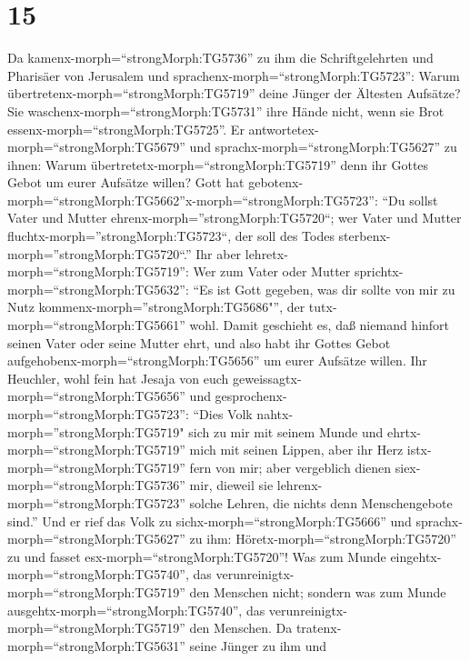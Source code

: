 \hypertarget{section-14}{%
\section{15}\label{section-14}}

 Da kamenx-morph=``strongMorph:TG5736'' zu ihm die
Schriftgelehrten und Pharisäer von Jerusalem und
sprachenx-morph=``strongMorph:TG5723'':  Warum
übertretenx-morph=``strongMorph:TG5719'' deine Jünger der Ältesten
Aufsätze? Sie waschenx-morph=``strongMorph:TG5731'' ihre Hände nicht,
wenn sie Brot essenx-morph=``strongMorph:TG5725''.  Er
antwortetex-morph=``strongMorph:TG5679'' und
sprachx-morph=``strongMorph:TG5627'' zu ihnen: Warum
übertretetx-morph=``strongMorph:TG5719'' denn ihr Gottes Gebot um eurer
Aufsätze willen?  Gott hat
gebotenx-morph=``strongMorph:TG5662''x-morph=``strongMorph:TG5723'':
``Du sollst Vater und Mutter ehrenx-morph=''strongMorph:TG5720``; wer
Vater und Mutter fluchtx-morph=''strongMorph:TG5723``, der soll des
Todes sterbenx-morph=''strongMorph:TG5720``.''  Ihr aber
lehretx-morph=``strongMorph:TG5719'': Wer zum Vater oder Mutter
sprichtx-morph=``strongMorph:TG5632'': ``Es ist Gott gegeben, was dir
sollte von mir zu Nutz kommenx-morph=''strongMorph:TG5686"'', der
tutx-morph=``strongMorph:TG5661'' wohl.  Damit geschieht es,
daß niemand hinfort seinen Vater oder seine Mutter ehrt, und also habt
ihr Gottes Gebot aufgehobenx-morph=``strongMorph:TG5656'' um eurer
Aufsätze willen.  Ihr Heuchler, wohl fein hat Jesaja von
euch geweissagtx-morph=``strongMorph:TG5656'' und
gesprochenx-morph=``strongMorph:TG5723'':  ``Dies Volk
nahtx-morph=''strongMorph:TG5719" sich zu mir mit seinem Munde und
ehrtx-morph=``strongMorph:TG5719'' mich mit seinen Lippen, aber ihr Herz
istx-morph=``strongMorph:TG5719'' fern von mir;  aber
vergeblich dienen siex-morph=``strongMorph:TG5736'' mir, dieweil sie
lehrenx-morph=``strongMorph:TG5723'' solche Lehren, die nichts denn
Menschengebote sind.''  Und er rief das Volk zu
sichx-morph=``strongMorph:TG5666'' und
sprachx-morph=``strongMorph:TG5627'' zu ihm:
Höretx-morph=``strongMorph:TG5720'' zu und fasset
esx-morph=``strongMorph:TG5720''!  Was zum Munde
eingehtx-morph=``strongMorph:TG5740'', das
verunreinigtx-morph=``strongMorph:TG5719'' den Menschen nicht; sondern
was zum Munde ausgehtx-morph=``strongMorph:TG5740'', das
verunreinigtx-morph=``strongMorph:TG5719'' den Menschen. 
Da tratenx-morph=``strongMorph:TG5631'' seine Jünger zu ihm und
